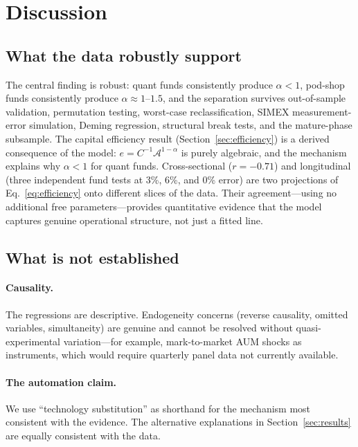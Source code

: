 \documentclass[12pt]{article}
\newcommand{\Ac}{\mathcal{A}}
\begin{document}





\section{Discussion}
\label{sec:discussion}

\subsection{What the data robustly support}

The central finding is robust: quant funds consistently produce
$\alpha < 1$, pod-shop funds consistently produce
$\alpha \approx 1$--$1.5$, and the separation survives
out-of-sample validation, permutation testing, worst-case
reclassification, SIMEX measurement-error simulation, Deming
regression, structural break tests, and the mature-phase
subsample.
The capital efficiency result (Section~\ref{sec:efficiency})
is a derived consequence of the model: $e = C^{-1}\Ac^{1-\alpha}$
is purely algebraic, and the mechanism explains why $\alpha < 1$
for quant funds.
Cross-sectional ($r = -0.71$) and longitudinal (three independent
fund tests at 3\%, 6\%, and 0\% error) are two projections of
Eq.~\eqref{eq:efficiency} onto different slices of the data.
Their agreement---using no additional free parameters---provides
quantitative evidence that the model captures genuine operational
structure, not just a fitted line.

\subsection{What is not established}

\paragraph{Causality.}
The regressions are descriptive.
Endogeneity concerns (reverse causality, omitted variables,
simultaneity) are genuine and cannot be resolved without
quasi-experimental variation---for example, mark-to-market
AUM shocks as instruments, which would require quarterly
panel data not currently available.

\paragraph{The automation claim.}
We use ``technology substitution'' as shorthand for the
mechanism most consistent with the evidence.
The alternative explanations in Section~\ref{sec:results}
are equally consistent with the data.
\end{document}
